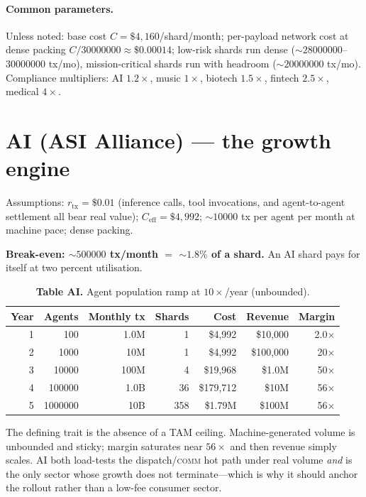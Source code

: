 \documentclass[11pt]{article}
\begin{document}
\paragraph{Common parameters.} Unless noted: base cost $C=\$4{,}160$/shard/month; per-payload network cost at dense packing $C/\num{30000000}\approx\$0.00014$; low-risk shards run dense (${\sim}\num{28000000}$--$\num{30000000}$ tx/mo), mission-critical shards run with headroom (${\sim}\num{20000000}$ tx/mo). Compliance multipliers: AI $1.2\times$, music $1\times$, biotech $1.5\times$, fintech $2.5\times$, medical $4\times$.

\section{AI (ASI Alliance) --- the growth engine}
\label{sec:ai}

Assumptions: $r_{\text{tx}}=\$0.01$ (inference calls, tool invocations, and agent-to-agent settlement all bear real value); $C_{\text{eff}}=\$4{,}992$; ${\sim}\num{10000}$ tx per agent per month at machine pace; dense packing.

\textbf{Break-even: ${\sim}\num{500000}$ tx/month ${=}$ ${\sim}1.8\%$ of a shard.} An AI shard pays for itself at two percent utilisation.

\begin{table}[h]
\centering
\caption*{\textbf{Table AI.} Agent population ramp at $10\times$/year (unbounded).}
\begin{tabular}{@{}rrrrrrr@{}}
\toprule
Year & Agents & Monthly tx & Shards & Cost & Revenue & Margin \\
\midrule
1 & \num{100}     & 1.0M  & 1   & \$4{,}992    & \$10{,}000  & 2.0$\times$ \\
2 & \num{1000}    & 10M   & 1   & \$4{,}992    & \$100{,}000 & 20$\times$ \\
3 & \num{10000}   & 100M  & 4   & \$19{,}968   & \$1.0M      & 50$\times$ \\
4 & \num{100000}  & 1.0B  & 36  & \$179{,}712  & \$10M       & 56$\times$ \\
5 & \num{1000000} & 10B   & 358 & \$1.79M      & \$100M      & 56$\times$ \\
\bottomrule
\end{tabular}
\end{table}

The defining trait is the absence of a TAM ceiling. Machine-generated volume is unbounded and sticky; margin saturates near $56\times$ and then revenue simply scales. AI both load-tests the dispatch/\textsc{comm} hot path under real volume \emph{and} is the only sector whose growth does not terminate---which is why it should anchor the rollout rather than a low-fee consumer sector.
\end{document}
